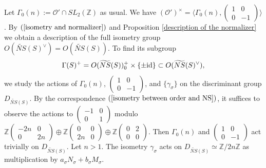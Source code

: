 \documentclass{article}
\theoremstyle{plain}
\theoremstyle{definition}
\theoremstyle{remark}
\newcommand{\Z}{{\mathbb Z}}
\begin{document}
Let $\Gamma _{0}(n) := \mathcal{O}' \cap SL_{2}({\Z})$ as usual. 
We have 
$(\mathcal{O}')^{\times}  =  
\langle \Gamma _{0}(n), 
(
\begin{smallmatrix} 
1 & 0 \\
0 & -1 
\end{smallmatrix}
) 
\rangle $. 
By $(\ref{isometry and normalizer})$ 
and Proposition \ref{description of the normalizer}
we obtain a description of the full isometry group 
$O(\widetilde{NS}(S)^{\vee}) = O(\widetilde{NS}(S))$.  
To find its subgroup 
\begin{equation*}
\Gamma (S)^{+} = O(\widetilde{NS}(S))_{0}^{+} \times \{ \pm {\rm id\/} \} 
\subset 
 O(\widetilde{NS}(S)^{\vee}), 
 \end{equation*}
 we study the actions of 
 $\Gamma _{0}(n)$, 
 $
 (
 \begin{smallmatrix}
 1 & 0 \\
 0 & -1 
 \end{smallmatrix}
 )
$, 
and  
$\{ \gamma _{\sigma} \}$ 
on the discriminant group $D_{\widetilde{NS}(S)}$. 
By the correspondence $(\ref{isometry between order and NS})$, 
it suffices to observe the actions to 
$(
\begin{smallmatrix}
-1 & 0 \\ 
0  & 1 
\end{smallmatrix}
)$ 
modulo 
$
{\Z}( 
          \begin{smallmatrix} 
                -2n & 0 \\ 
                  0     & 2n 
           \end{smallmatrix}
         ) 
\oplus 
{\Z}( 
           \begin{smallmatrix} 
                   0       & 0 \\ 
                   2n     & 0 
           \end{smallmatrix}
         ) 
\oplus 
{\Z}( 
         \begin{smallmatrix} 
                0     & 2 \\ 
                0     & 0 
           \end{smallmatrix}
         ) 
$. 
Then 
$\Gamma _{0}(n)$ and  
$(
\begin{smallmatrix}
1  & 0 \\ 
0  & -1 
\end{smallmatrix}
)$ 
act trivially on $D_{\widetilde{NS}(S)}$. 
Let $n>1$.   
The isometry $\gamma _{\sigma}$ 
acts on $D_{\widetilde{NS}(S)} \simeq {\Z}/2n{\Z}$ 
as multiplication by 
$a_{\sigma}N_{\sigma} + b_{\sigma}M_{\sigma}$.   
\end{document}

